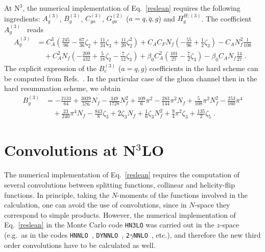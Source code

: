 \documentclass[12pt]{article}
\DeclareRobustCommand{\nn}{\nonumber}
\DeclareRobustCommand{\LO}{\text{LO}\xspace}
\DeclareRobustCommand{\N}[1]{\ensuremath{\text{N}^{#1}}} %
\begin{document}
\begin{appendix}
At \N3\LO, the numerical implementation of Eq.~\eqref{reslean} requires the following ingredients: $A^{(3)}_{g}$, $B^{(3)}_{g}$, $C^{(3)}_{ga}$, $G^{(2)}_{ga}$ ($a=q,{\bar q},g$) and $H^{H;(3)}_{g}$. The coefficient $A_g^{(3)}$~\cite{Becher:2010tm} reads
\begin{align}
  A_g^{(3)} &=  
  C_A^3 \left( 
    \frac{245}{96} 
    - \frac{67}{36}\zeta_2
    + \frac{11}{24}\zeta_3 + \frac{11}{20}\zeta_2^2\right) 
    + C_A C_F N_f \left(-\frac{55}{96} 
    + \frac{1}{2}\zeta_3
  \right)
  -C_A N_f^2 \frac{1}{108} 
  \nn\\&\quad
  + C_A^2 N_f \left(
    - \frac{209}{432} 
    + \frac{5}{18}\zeta_2 
    - \frac{7}{12} \zeta_3
  \right)  
  + \beta_{0} C_A^2 \left(
    \frac{101}{27}
    -\frac{7}{2}\zeta_{3}
  \right)
  -\beta_{0} C_A N_f \frac{14}{27} \;.
  \label{acoeff}
\end{align}
The explicit expression of the $B_c^{(3)}$ ($a=q,g$) coefficients in the hard scheme can be computed from Refs.~\cite{Li:2016ctv,Vladimirov:2016dll}. In the particular case of the gluon channel then in the hard resummation scheme, we obtain
\begin{align}
  B_g^{(3)} &= 
  - \frac{2133}{64} 
  + \frac{3029}{576} N_{f} 
  - \frac{349}{1728} N_{f}^{2}  
  + \frac{109}{6} \pi^{2} 
  - \frac{283}{144} \pi^{2}  N_{f} 
  + \frac{5}{108} \pi^{2}  N_{f}^{2}
  -\frac{253}{160} \pi^{4}
  \nn\\&\quad
  +\frac{23}{240} \pi^{4} N_{f}
  -\frac{843}{8} \zeta_{3} 
  + 2 \zeta_{3} N_{f} 
  + \frac{1}{6} \zeta_{3} N_{f}^{2} 
  + \frac{9}{4} \pi^{2}  \zeta_{3} 
  + \frac{135}{2}  \zeta_{5} \;.
\end{align}


\section{Convolutions at \texorpdfstring{N${}^\text{3}$LO}{N3LO}}
\label{app:Convos}

The numerical implementation of Eq.~\eqref{reslean} requires the computation of several convolutions between splitting functions, collinear and helicity-flip functions. In principle, taking the $N$-moments of the functions involved in the calculation, one can avoid the use of convolutions, since in $N$-space they correspond to simple products. However, the numerical implementation of Eq.~\eqref{reslean} in the Monte Carlo code \texttt{HN3LO} was carried out in the $z$-space (e.g.\ as in the codes \texttt{HNNLO}~\cite{Catani:2007vq}, \texttt{DYNNLO}~\cite{Catani:2009sm}, \texttt{2$\gamma$NNLO}~\cite{Catani:2011qz}, etc.), and therefore the new third order convolutions have to be calculated as well. 


\end{appendix}
\end{document}
